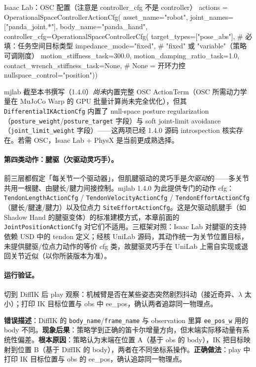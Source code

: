 \begin{codebox}[Python]{Isaac Lab：OSC 配置（注意是 controller\_cfg 不是 controller）}
actions = OperationalSpaceControllerActionCfg(
    asset_name="robot", joint_names=["panda_joint.*"], body_name="panda_hand",
    controller_cfg=OperationalSpaceControllerCfg(
        target_types=["pose_abs"],      # 必填：任务空间目标类型
        impedance_mode="fixed",         # "fixed" 或 "variable"（策略可调刚度）
        motion_stiffness_task=300.0, motion_damping_ratio_task=1.0,
        contact_wrench_stiffness_task=None,  # None = 开环力控
        nullspace_control="position"))
\end{codebox}

mjlab 截至本书撰写（1.4.0）\emph{尚未}内置完整 OSC ActionTerm（OSC 所需动力学量在 MuJoCo Warp 的 GPU 批量计算尚未完全优化），但其 \verb|DifferentialIKActionCfg| 内置了 null-space posture regularization（\verb|posture_weight|/\verb|posture_target| 字段）与 soft joint-limit avoidance（\verb|joint_limit_weight| 字段）——这两项已经 1.4.0 源码 introspection 核实存在。若需 OSC，Isaac Lab + PhysX 是当前更成熟选择。

\paragraph{第四类动作：腱驱（欠驱动灵巧手）。}前三层都假定「每关节一个驱动器」，但肌腱驱动的灵巧手是\emph{欠驱动}的——多关节共用一根腱、由腱长/腱力间接控制。mjlab 1.4.0 为此提供专门的动作 cfg：\verb|TendonLengthActionCfg| / \verb|TendonVelocityActionCfg| / \verb|TendonEffortActionCfg|（腱长/腱速/腱力）以及位点力 \verb|SiteEffortActionCfg|。这是欠驱动肌腱手（如 Shadow Hand 的腱驱变体）的标准建模方式，本章前面的 \verb|JointPositionActionCfg| 对它们不适用。三框架对照：Isaac Lab 对腱驱的支持依赖 USD 中的 tendon 定义；经核 UniLab 源码，其动作统一为关节位置目标，未提供腱驱/位点力动作的等价 cfg 类，故腱驱灵巧手在 UniLab 上需自实现或退回关节近似（以你所装版本为准）。

\paragraph{运行验证。}切到 DiffIK 后 play 观察：机械臂是否在某些姿态突然剧烈抖动（接近奇异、$\lambda$ 太小）；打印 IK 目标位置与 obs 中 ee\_pos，确认两者追踪同一物理点。

\begin{pitfall}
\textbf{错误描述}：DiffIK 的 \verb|body_name|/\verb|frame_name| 与 observation 里算 \verb|ee_pos_w| 用的 body 不同。\textbf{现象后果}：策略学到正确的笛卡尔增量方向，但末端实际移动量有系统性偏差。\textbf{根本原因}：策略认为末端在位置 A（基于 obs 的 body），IK 把目标映射到位置 B（基于 DiffIK 的 body），两者在不同坐标系操作。\textbf{正确做法}：play 中打印 IK 目标位置与 obs 的 ee\_pos，确认追踪同一物理点。
\end{pitfall}

